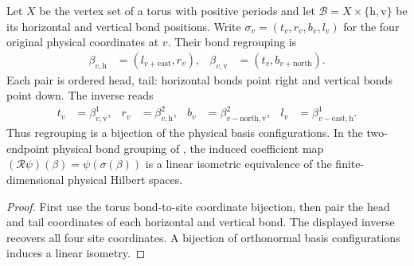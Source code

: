 \begin{definition}%
    \label{def:peps_torus_physical_bond_regrouping}
    \leanok
    Let $X$ be the vertex set of a torus with positive periods and let
    $\mathcal B=X\times\{\mathrm h,\mathrm v\}$ be its horizontal and
    vertical bond positions. Write $\sigma_v=(t_v,r_v,b_v,l_v)$ for the
    four original physical coordinates at $v$. Their bond regrouping is
    \begin{align}
        \beta_{v,\mathrm h} & =(l_{v+\mathrm{east}},r_v),  &
        \beta_{v,\mathrm v} & =(t_v,b_{v+\mathrm{north}}).
        \label{eq:peps_physical_bond_regrouping}
    \end{align}
    Each pair is ordered head, tail: horizontal bonds point right and
    vertical bonds point down. The inverse reads
    \begin{align}
        t_v & =\beta^1_{v,\mathrm v},                & r_v & =\beta^2_{v,\mathrm h}, &
        b_v & =\beta^2_{v-\mathrm{north},\mathrm v}, &
        l_v & =\beta^1_{v-\mathrm{east},\mathrm h}.
    \end{align}
    Thus regrouping is a bijection of the physical basis
    configurations. In the two-endpoint physical bond grouping of
    \cite[Section~7]{Schuch2010PEPS}, the induced coefficient map
    $(\mathcal R\psi)(\beta)=\psi(\sigma(\beta))$ is a linear
    isometric equivalence of the finite-dimensional physical Hilbert spaces.
\end{definition}
\begin{proof}\leanok
    First use the torus bond-to-site coordinate bijection, then pair the
    head and tail coordinates of each horizontal and vertical bond.
    The displayed inverse recovers all four site coordinates. A bijection
    of orthonormal basis configurations induces a linear isometry.
\end{proof}

